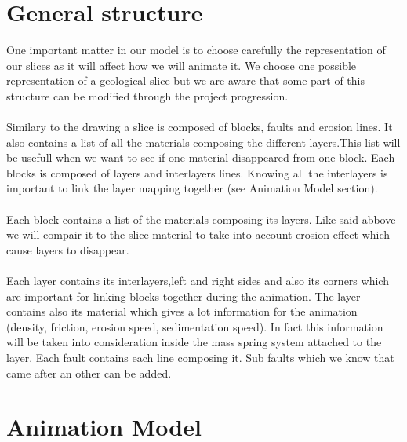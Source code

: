 \documentclass[12pt, a4paper]{memoir} %
\begin{document}
\section{General structure}
One important matter in our model is to choose carefully the representation of our slices as it will affect how we will animate it.
We choose one possible representation of a geological slice but we are aware that some part of this structure can be modified through the project progression.\\\\
Similary to the drawing a slice is composed of blocks, faults and erosion lines. It also contains a list of all the materials composing the different layers.This list will be usefull when we want to see if one material disappeared from one block. Each blocks is composed of layers and interlayers lines. Knowing all the interlayers is important to link the layer mapping together (see Animation Model section).\\\\
Each block contains a list of the materials composing its layers. Like said abbove we will compair it to the slice material to take into account erosion effect which cause layers to disappear. \\\\
Each layer contains its interlayers,left and right sides and also its corners which are important for linking blocks together during the animation. The layer contains also its material which gives a lot information for the animation (density, friction, erosion speed, sedimentation speed). 
In fact this information will be taken into consideration inside the mass spring system attached to the layer.
Each fault contains each line composing it. Sub faults which we know that came after an other can be added.


\section{Animation Model}
\end{document}
